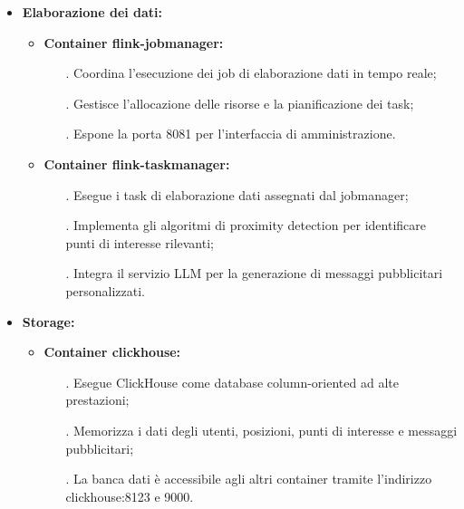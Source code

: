 \documentclass[10pt]{article}
\begin{document}
\begin{itemize}
    \item \textbf{Elaborazione dei dati:}
    \begin{itemize}
        \item \textbf{Container flink-jobmanager:}
        \begin{itemize}
            \item[.] Coordina l'esecuzione dei job di elaborazione dati in tempo reale;
            \item[.] Gestisce l'allocazione delle risorse e la pianificazione dei task;
            \item[.] Espone la porta 8081 per l'interfaccia di amministrazione.
        \end{itemize}
        \item \textbf{Container flink-taskmanager:}
        \begin{itemize}
            \item[.] Esegue i task di elaborazione dati assegnati dal jobmanager;
            \item[.] Implementa gli algoritmi di proximity detection per identificare punti di interesse rilevanti;
            \item[.] Integra il servizio LLM per la generazione di messaggi pubblicitari personalizzati.
        \end{itemize}
    \end{itemize}
    
    \item \textbf{Storage:}
    \begin{itemize}
        \item \textbf{Container clickhouse:}
        \begin{itemize}
            \item[.] Esegue ClickHouse come database column-oriented ad alte prestazioni;
            \item[.] Memorizza i dati degli utenti, posizioni, punti di interesse e messaggi pubblicitari;
            \item[.] La banca dati è accessibile agli altri container tramite l'indirizzo clickhouse:8123 e 9000.
        \end{itemize}
    \end{itemize}
    

\end{itemize}
\end{document}
